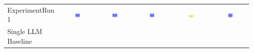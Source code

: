 \begin{table}
\begin{tabular}{@{}lccccc@{}}
    ExperimentRun 1 & \includegraphics[width=0.15\textwidth]{./run_1/png/gpt-4o_results/MicrofluidicChip.png} & \includegraphics[width=0.15\textwidth]{./run_1/png/o1-preview_results/MicrofluidicChip.png} & \includegraphics[width=0.15\textwidth]{./run_1/png/claude-3-5-sonnet-20240620_results/MicrofluidicChip.png} & \includegraphics[width=0.15\textwidth]{./run_1/png/watsonx_meta-llama_llama-3-1-70b-instruct_results/MicrofluidicChip.png} & \includegraphics[width=0.15\textwidth]{./run_1/png/watsonx_meta-llama_llama-3-405b-instruct_results/MicrofluidicChip.png} \\
    Single LLM Baseline \\

\end{tabular}
\end{table}
